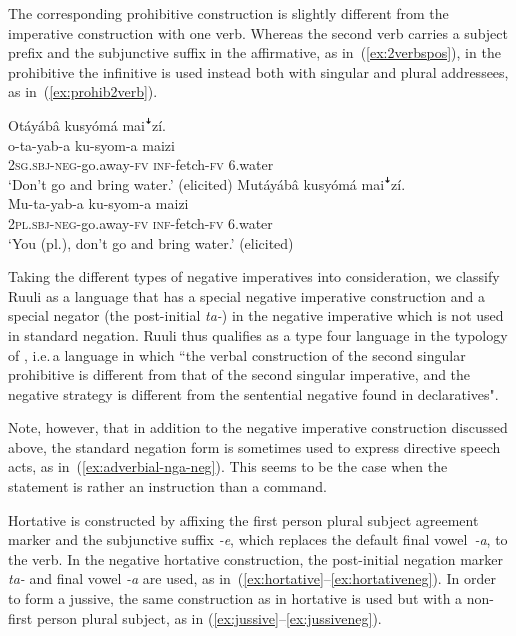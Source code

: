\documentclass[output=paper,colorlinks,citecolor=brown,draftmode]{langscibook}
\begin{document}
The corresponding prohibitive construction is slightly different from the imperative construction with one verb. 
Whereas the second verb carries a subject prefix and the subjunctive suffix in the affirmative, as in~(\ref{ex:2verbspos}), in the prohibitive the infinitive is used instead both with singular and plural addressees, as in~(\ref{ex:prohib2verb}). 


\ea \label{ex:prohib2verb}\label{ex:ruulietal:10}
\begin{xlist}
\ex \label{ex:prohib2verbsing}
	\glll  Otáyábâ kusyómá maiꜜzí.\\
	        o-ta-yab-a ku-syom-a maizi\\
		    \textsc{2sg.sbj}-\textsc{neg}-go.away-\textsc{fv} \textsc{inf}-fetch-\textsc{fv} 6.water\\
    \glt ‘Don't go and bring water.’  (elicited)
\ex \label{ex:prohib2verbpl}
	\glll   Mutáyábâ kusyómá maiꜜzí.\\
	        Mu-ta-yab-a ku-syom-a maizi\\
		    2\textsc{pl.sbj}-\textsc{neg}-go.away-\textsc{fv} \textsc{inf}-fetch-\textsc{fv} 6.water\\
    \glt ‘You (pl.), don't go and bring water.’  (elicited)
\end{xlist}
\z

Taking the different types of negative imperatives into consideration, we classify Ruuli as a language that has a special negative imperative construction and a special negator (the post-initial \emph{ta-}) in the negative imperative which is not used in standard negation. 
Ruuli thus qualifies as a type four language in the typology of \citet{AuweraEtAl2013}, i.e.\,a language in which ``the verbal construction of the second singular prohibitive is different from that of the second singular imperative, and the negative strategy is different from the sentential negative found in declaratives". 

Note, however, that in addition to the negative imperative construction discussed above, the standard negation form is sometimes used to express directive speech acts, as in~(\ref{ex:adverbial-nga-neg}). 
This seems to be the case when the statement is rather an instruction than a command.

Hortative is constructed by affixing the first person plural subject agreement marker and the subjunctive suffix \textit{-e}, which replaces the default final vowel~\textit{-a}, to the verb. 
In the negative hortative construction, the post-initial negation marker \textit{ta-} and final vowel \textit{-a} are used, as in~(\ref{ex:hortative}--\ref{ex:hortativeneg}). 
In order to form a jussive, the same construction as in hortative is used but with a non-first person plural subject, as in  (\ref{ex:jussive}--\ref{ex:jussiveneg}).
\end{document}
